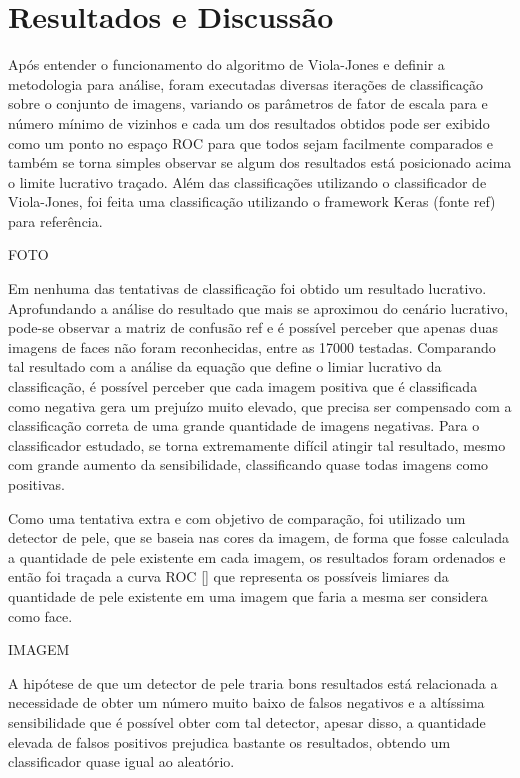 \chapter{Resultados e Discussão}\label{cap:resultados}

Após entender o funcionamento do algoritmo de Viola-Jones e definir a metodologia para análise, foram executadas diversas iterações de classificação sobre o conjunto de imagens, variando os parâmetros de fator de escala para e número mínimo de vizinhos e cada um dos resultados obtidos pode ser exibido como um ponto no espaço ROC para que todos sejam facilmente comparados e também se torna simples observar se algum dos resultados está posicionado acima o limite lucrativo traçado. Além das classificações utilizando o classificador de Viola-Jones, foi feita uma classificação utilizando o framework Keras (fonte ref{}) para referência. 

FOTO

Em nenhuma das tentativas de classificação foi obtido um resultado lucrativo. Aprofundando a análise do resultado que mais se aproximou do cenário lucrativo, pode-se observar a matriz de confusão ref{} e é possível perceber que apenas duas imagens de faces não foram reconhecidas, entre as 17000 testadas.
Comparando tal resultado com a análise da equação que define o limiar lucrativo da classificação, é possível perceber que cada imagem positiva que é classificada como negativa gera um prejuízo muito elevado, que precisa ser compensado com a classificação correta de uma grande quantidade de imagens negativas. Para o classificador estudado, se torna extremamente difícil atingir tal resultado, mesmo com grande aumento da sensibilidade, classificando quase todas imagens como positivas.

Como uma tentativa extra e com objetivo de comparação, foi utilizado um detector de pele, que se baseia nas cores da imagem, de forma que fosse calculada a quantidade de pele existente em cada imagem, os resultados foram ordenados e então foi traçada a curva ROC \ref{} que representa os possíveis limiares da quantidade de pele existente em uma imagem que faria a mesma ser considera como face.

IMAGEM

A hipótese de que um detector de pele traria bons resultados está relacionada a necessidade de obter um número muito baixo de falsos negativos e a altíssima sensibilidade que é possível obter com tal detector, apesar disso, a quantidade elevada de falsos positivos prejudica bastante os resultados, obtendo um classificador quase igual ao aleatório. 

